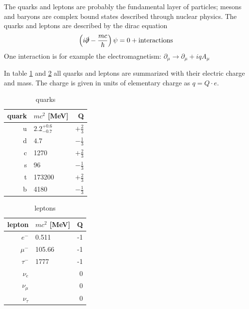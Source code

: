 \documentclass{include/thesisclass}
\newcommand{\cc}{\cdot}
\newcommand{\df}{\rightarrow}
\newcommand{\p}{\partial}
\newcommand{\dslash}{\slashed{\partial}}
\begin{document}
The quarks and leptons are probably the fundamental layer of particles; mesons and baryons are complex bound states described through nuclear physics. The quarks and leptons are described by the dirac equation
\[ \left( i \dslash - \frac{mc}{\hbar} \right)\psi = 0 + \si{interactions}\]
One interaction is for example the electromagnetism: $\p_\mu \df \p_\mu + iq A_\mu$

In table \ref{quarks} and \ref{leptons} all quarks and leptons are summarized with their electric charge and mass. The charge is given in units of elementary charge as $q = Q\cc e$.\\
\begin{minipage}{80mm}
\begin{table}[H]
\centering
\begin{tabular}{r|lr}
quark & $mc^2$ [MeV] & Q \\
\midrule
u & $2.2^{+0.6}_{-0.7}$ & $+\frac{2}{3}$\\
d & $4.7$ & $-\frac{1}{3}$\\
\midrule
c & 1270 & $+\frac{2}{3}$\\
s & 96 & $-\frac{1}{3}$\\
\midrule
t & 173200 & $+\frac{2}{3}$\\
b & 4180 & $-\frac{1}{3}$\\
\bottomrule
\end{tabular}
\caption{quarks}
\label{quarks}
\end{table}
\end{minipage}
\begin{minipage}{80mm}
\begin{table}[H]
\centering
\begin{tabular}{r|lr}
lepton & $mc^2$ [MeV] & Q\\
\midrule
$e^-$ & 0.511 & -1\\
$\mu^-$ & 105.66 & -1 \\
$\tau^-$ & 1777 & -1 \\
\midrule
$\nu_e$ & & 0\\
$\nu_\mu$ & & 0\\
$\nu_\tau$ & &0\\
\bottomrule
\end{tabular}
\caption{leptons}
\label{leptons}
\end{table}
\end{minipage}
\end{document}
